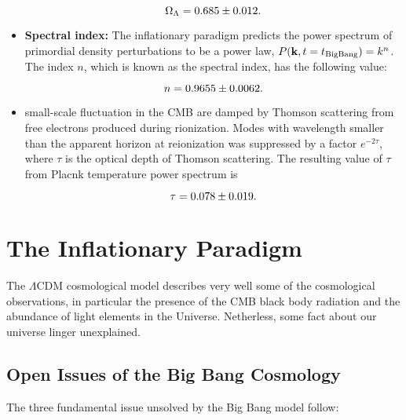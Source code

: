 \begin{itemize}
        \begin{equation}
                \Omega_\Lambda = \num{0.685 \pm 0.012}.
        \end{equation}

        \item \textbf{Spectral index:} The inflationary paradigm predicts
        the power spectrum of primordial density perturbations to be a
        power law, $P\qty(\vb{k},t = t_\text{BigBang}) = k^n$. The index
        $n$, which is known as the spectral index, has the following value:

        \begin{equation}
                n = \num{0.9655 \pm 0.0062}.
        \end{equation}

        \item small-scale fluctuation in the CMB are damped by Thomson
        scattering from free electrons produced during rionization. Modes
        with wavelength smaller than the apparent horizon at reionization
        was suppressed by a factor $e^{-2\tau}$, where $\tau$ is the optical
        depth of Thomson scattering. The resulting value of $\tau$ from Placnk
        temperature power spectrum is

        \begin{equation}
                \tau = \num{0.078 \pm 0.019}.
        \end{equation}
\end{itemize}

\section{The Inflationary Paradigm}

The $\Lambda$CDM cosmological model describes very well some of the
cosmological observations, in particular the presence of the CMB black
body radiation and the abundance of light elements in the Universe.
Netherless, some fact about our universe linger unexplained.

\subsection{Open Issues of the Big Bang Cosmology}\label{ss:issues}

The three fundamental issue unsolved by the Big Bang model follow:


